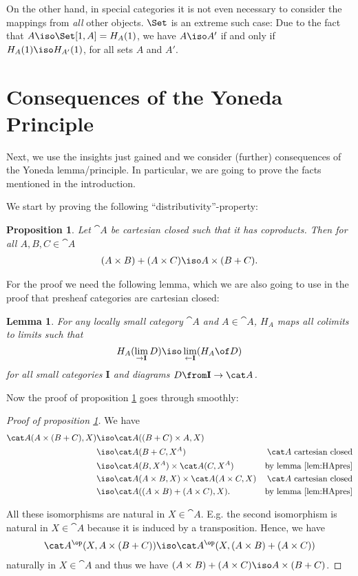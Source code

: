 \documentclass{article}
\newtheorem{lemma}{Lemma}
\newtheorem{proposition}{Proposition}
\theoremstyle{definition}
\numberwithin{equation}{section}
\begin{document}
On the other hand, in special categories it is not even necessary to consider the mappings from \emph{all} other objects. $\Set$ is an extreme such case: Due to the fact that $A\iso\Set[1,A]=H_A(1)$, we have $A\iso A'$ if and only if $H_A(1)\iso H_{A'}(1)$, for all sets $A$ and $A'$.

\section{Consequences of the Yoneda Principle}
Next, we use the insights just gained and we consider (further) consequences of the Yoneda lemma/principle. In particular, we are going to prove the facts mentioned in the introduction.

We start by proving the following ``distributivity''-property:

\begin{proposition}
  \label{prop:dis}
  Let $\cat A$ be cartesian closed such that it has coproducts. Then for all $A,B,C\in\cat A$
  \begin{align*}
    (A\times B)+(A\times C)\iso A\times (B+C).
  \end{align*}
\end{proposition}

For the proof we need the following lemma, which we are also going to use in the proof that presheaf categories are cartesian closed:
\begin{lemma}
  \label{lem:HApres}
  For any locally small category $\cat A$ and $A\in\cat A$, $H_A$ maps all colimits to limits such that $$H_A(\lim_{\to\mathbf I} D)\iso \lim_{\leftarrow\mathbf I}(H_A\of D)$$ for all small categories $\mathbf I$ and diagrams $D\from \mathbf I\to\cat A$.
\end{lemma}
Now the proof of proposition \ref{prop:dis} goes through smoothly:
\begin{proof}[Proof of proposition \ref{prop:dis}]
  We have 
  \begin{align*}
    \cat A(A\times (B+C),X)&\iso\cat A((B+C)\times A,X)\\
                           &\iso\cat A(B+C,X^A)&\cat A\text{ cartesian closed}\\
                           &\iso\cat A(B,X^A)\times \cat A(C,X^A) &\text{by lemma \ref{lem:HApres}}\\
                           &\iso\cat A(A\times B,X)\times \cat A(A\times C,X) &\cat A\text{ cartesian closed}\\
                           &\iso\cat A((A\times B)+(A\times C),X).&\text{by lemma \ref{lem:HApres}}
  \end{align*}
  
  All these isomorphisms are natural in $X\in\cat A$. E.g. the second isomorphism is natural in $X\in\cat A$ because it is induced by a transposition. Hence, we have 
  \begin{align*}
    \cat A^\op(X,A\times (B+C))\iso\cat A^\op(X,(A\times B)+(A\times C))
  \end{align*}
 naturally in $X\in\cat A$ and thus we have $(A\times B)+(A\times C)\iso A\times (B+C)$.
\end{proof}
\end{document}
